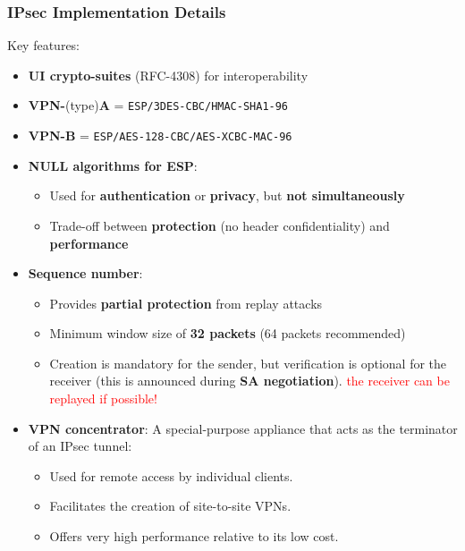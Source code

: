 \subsubsection{IPsec Implementation Details}
Key features:
\begin{itemize}
    \item \textbf{UI crypto-suites} (RFC-4308) for interoperability
    \item \textbf{VPN-}(type)\textbf{A} = \texttt{ESP/3DES-CBC/HMAC-SHA1-96}
    \item \textbf{VPN-B} = \texttt{ESP/AES-128-CBC/AES-XCBC-MAC-96}
    \item \textbf{NULL algorithms for ESP}:
    \begin{itemize}
        \item Used for \textbf{authentication} or \textbf{privacy}, but \textbf{not simultaneously}
        \item Trade-off between \textbf{protection} (no header confidentiality) and \textbf{performance}
    \end{itemize}
    \item \textbf{Sequence number}:
    \begin{itemize}
        \item Provides \textbf{partial protection} from replay attacks
        \item Minimum window size of \textbf{32 packets} (64 packets recommended)
        \item Creation is mandatory for the sender, but verification is optional for the receiver (this is announced during \textbf{SA negotiation}). \textcolor{red}{the receiver can be replayed if possible!}
    \end{itemize}
    \item \textbf{VPN concentrator}: A special-purpose appliance that acts as the terminator of an IPsec tunnel:
    \begin{itemize}
        \item Used for remote access by individual clients.
        \item Facilitates the creation of site-to-site VPNs.
        \item Offers very high performance relative to its low cost.
    \end{itemize}
\end{itemize}



